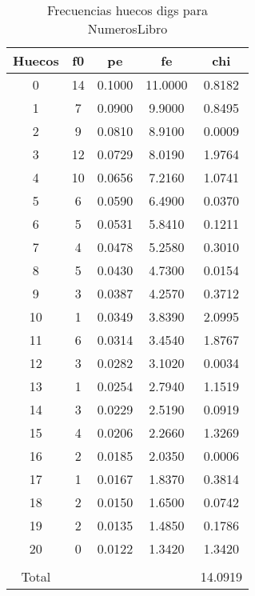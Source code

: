 \documentclass[a4paper]{article}
\begin{document}
\begin{table}
\centering
\begin{tabular}{ccccc}
\\\hline
Huecos&f0&pe&fe&chi\\\hline
0&14&0.1000&11.0000&0.8182\\
1&7&0.0900&9.9000&0.8495\\
2&9&0.0810&8.9100&0.0009\\
3&12&0.0729&8.0190&1.9764\\
4&10&0.0656&7.2160&1.0741\\
5&6&0.0590&6.4900&0.0370\\
6&5&0.0531&5.8410&0.1211\\
7&4&0.0478&5.2580&0.3010\\
8&5&0.0430&4.7300&0.0154\\
9&3&0.0387&4.2570&0.3712\\
10&1&0.0349&3.8390&2.0995\\
11&6&0.0314&3.4540&1.8767\\
12&3&0.0282&3.1020&0.0034\\
13&1&0.0254&2.7940&1.1519\\
14&3&0.0229&2.5190&0.0919\\
15&4&0.0206&2.2660&1.3269\\
16&2&0.0185&2.0350&0.0006\\
17&1&0.0167&1.8370&0.3814\\
18&2&0.0150&1.6500&0.0742\\
19&2&0.0135&1.4850&0.1786\\
20&0&0.0122&1.3420&1.3420\\
\\\hline
Total & & & &14.0919\\\hline
\end{tabular}
\caption{\label{tab:frechuecosdigsNumerosLibro}Frecuencias huecos digs para NumerosLibro}
\end{table}
\end{document}
